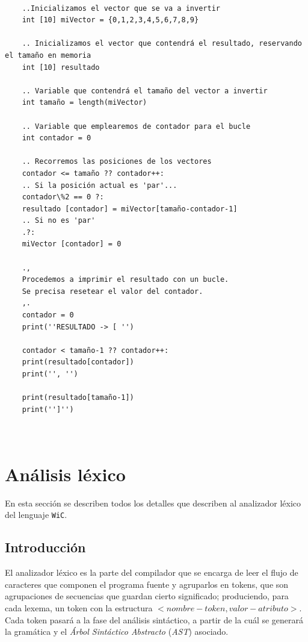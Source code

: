 \documentclass[11pt, english]{article}
\begin{document}
	\begin{lstlisting}[caption=Cambiar el orden de los elementos en un Array con condición.]
	
	..Inicializamos el vector que se va a invertir
	int [10] miVector = {0,1,2,3,4,5,6,7,8,9}
	
	.. Inicializamos el vector que contendrá el resultado, reservando el tamaño en memoria
	int [10] resultado
	
	.. Variable que contendrá el tamaño del vector a invertir
	int tamaño = length(miVector)
	
	.. Variable que emplearemos de contador para el bucle
	int contador = 0
	
	.. Recorremos las posiciones de los vectores
	contador <= tamaño ?? contador++:
	.. Si la posición actual es 'par'...
	contador\%2 == 0 ?:
	resultado [contador] = miVector[tamaño-contador-1]
	.. Si no es 'par'
	.?:
	miVector [contador] = 0
	
	., 
	Procedemos a imprimir el resultado con un bucle.
	Se precisa resetear el valor del contador.
	,.
	contador = 0
	print(''RESULTADO -> [ '')
	
	contador < tamaño-1 ?? contador++:
	print(resultado[contador])
	print('', '')
	
	print(resultado[tamaño-1])
	print('']'')
	
	
	\end{lstlisting}
	
	
	
	\section{Análisis léxico}\label{Definicion-lenguaje}
	En esta sección se describen todos los detalles que describen al analizador léxico del lenguaje \texttt{WiC}.
	
	\subsection{Introducción}\label{Introdución}
	El analizador léxico es la parte del compilador que se encarga de leer el flujo de caracteres que componen el programa fuente y agruparlos en tokens, que son agrupaciones de secuencias que guardan cierto significado; produciendo, para cada lexema, un token con la estructura $<nombre-token, valor-atributo>$. Cada token pasará a la fase del análisis sintáctico, a partir de la cuál se generará la gramática y el \textit{Árbol Sintáctico Abstracto} (\textit{AST}) asociado.
	
\end{document}
